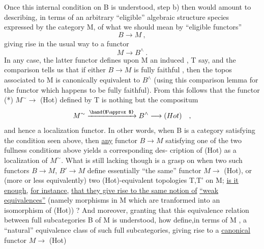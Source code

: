
Once this internal condition on B is understood,  step b) then would
amount to describing,  in terms of an arbitrary ``eligible'' algebraic
structure species  expressed by the category M,  of what we should
mean by ``eligible functors''  
\[ B \longrightarrow M \ , \]
giving rise in the usual way to a functor
\[ M \rightarrow B^{\wedge} \ . \]
In any case,  the latter functor defines upon M an induced ,
T say,  and the comparison  tells us that if either $B \rightarrow M$  is fully
faithful ,  then the topos associated to M is canonically equivalent
to $B^{\wedge}$  (using this comparison lemma for the functor which happens to be
fully faithful).   From this follows that the functor
(*)  $M^{\sim} \rightarrow$ (Hot)  defined by T  is nothing but the compositum
\[ M^{\sim} \xrightarrow{\hand{$\approx$}} B^{\wedge} \longrightarrow (Hot) \quad , \]
and hence a localization functor.  In other words,  when B is a category
satisfying the condition seen above, then \uline{any} functor $B \rightarrow M$ satisfying
one of the two fullness conditions above  yields a corresponding des-%
cription of (Hot) as a localization of $M^{\sim}$.  What is still lacking though
is a grasp on when two such functors  $B \rightarrow M$,  $B' \rightarrow M$  define essentially
``the same'' functor  $M \rightarrow$ (Hot),  or (more or less equivalently)  two
(Hot)-equivalent topologies T,T' on M;  \uline{is it enough,}  \uline{for instance,}
\uline{that they give rise to the same notion of} \uline{``weak equivalences''}  (namely 
morphisms in M which are tranformed into an isomorphism of (Hot)) ?
And moreover,   granting that this equivalence relation between
 full subcategories  B of M is understood,  how define,in terms of M ,
a ``natural'' equivalence class of such full subcategories,  giving rise
to a \uline{canonical} functor  $M \rightarrow$ (Hot)   

